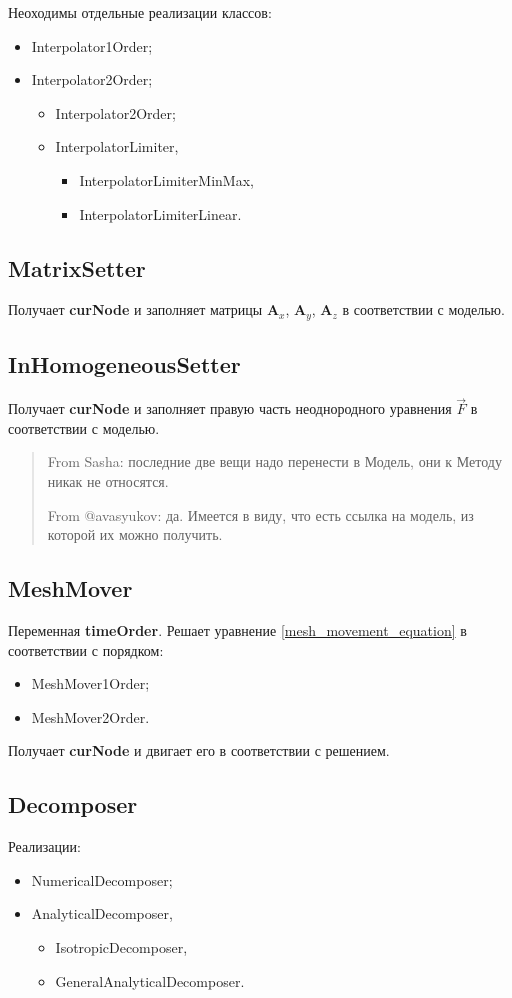 \documentclass[a4paper,12pt]{article}
\numberwithin{equation}{section}
\begin{document}
	Неоходимы отдельные реализации классов:
	\begin{itemize}
		\item{Interpolator1Order;}
		\item{Interpolator2Order;}
		\begin{itemize}
				\item{Interpolator2Order;}
				\item{InterpolatorLimiter,}
				\begin{itemize}
					\item{InterpolatorLimiterMinMax,}
					\item{InterpolatorLimiterLinear.}
				\end{itemize}
		\end{itemize}
	\end{itemize}
	
\subsection{MatrixSetter}
	Получает \textbf{curNode} и заполняет матрицы $\mathbf{A}_x$, $\mathbf{A}_y$, $\mathbf{A}_z$ в соответствии с моделью.
	
\subsection{InHomogeneousSetter}
	Получает \textbf{curNode} и заполняет правую часть неоднородного уравнения $\vec{F}$ в соответствии с моделью.

\blockquote{
From Sasha: последние две вещи надо перенести в Модель, они к Методу никак не относятся.

From @avasyukov: да. Имеется в виду, что есть ссылка на модель, из которой их можно получить.
}

\subsection{MeshMover}
	Переменная \textbf{timeOrder}.
	Решает уравнение \eqref{mesh_movement_equation} в соответствии с порядком:
	\begin{itemize}
		\item{MeshMover1Order;}
		\item{MeshMover2Order.}
	\end{itemize}	
	
	Получает \textbf{curNode} и двигает его в соответствии с решением.

\subsection{Decomposer}
	Реализации:
	\begin{itemize}
			\item{NumericalDecomposer;}
			\item{AnalyticalDecomposer,}
			\begin{itemize}
					\item{IsotropicDecomposer,}
					\item{GeneralAnalyticalDecomposer.}
			\end{itemize}
	\end{itemize}
\end{document}
